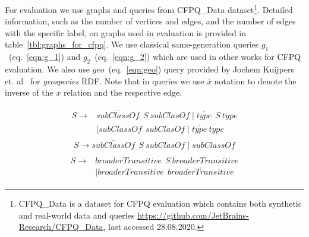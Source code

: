 For evaluation we use graphs and queries from CFPQ\_Data dataset\footnote{CFPQ\_Data is a dataset for CFPQ evaluation which contains both synthetic and real-world data and queries \url{https://github.com/JetBrains-Research/CFPQ\_Data}, last accessed 28.08.2020.}.
Detailed information, such as the number of vertices and edges, and the number of edges with the specific label, on graphs used in evaluation is provided in table~\ref{tbl:graphs_for_cfpq}.
We use classical same-generation queries $g_1$~(eq.~\ref{eqn:g_1}) and $g_2$~(eq.~\ref{eqn:g_2}) which are used in other works for CFPQ evaluation.
We also use $geo$~(eq.~\ref{eqn:geo}) query provided by Jochem Kuijpers et. al~\cite{Kuijpers:2019:ESC:3335783.3335791} for \textit{geospecies} RDF.
Note that in queries we use $\overline{x}$ notation to denote the inverse of the $x$ relation and the respective edge.

\begin{align}
\begin{split}
\label{eqn:g_1}
S \to & \overline{\textit{subClassOf}} \ \ S \ \textit{subClasOf} \mid \overline{\textit{type}} \ \ S \ \textit{type}\\   & \mid \overline{\textit{subClassOf}} \ \ \textit{subClasOf} \mid \overline{\textit{type}} \ \textit{type}
\end{split}
\end{align}
\begin{align}
\label{eqn:g_2}
S \to \overline{\textit{subClassOf}} \ \ S \ \textit{subClasOf} \mid \textit{subClassOf}
\end{align}
\begin{align}
\begin{split}
\label{eqn:geo}
S \to & \textit{broaderTransitive} \ \  S \ \overline{\textit{broaderTransitive}} \\
      & \mid \textit{broaderTransitive} \ \  \overline{\textit{broaderTransitive}}
\end{split}
\end{align}

